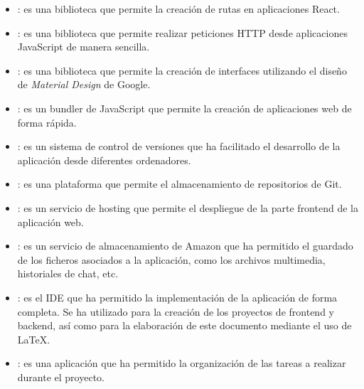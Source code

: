 \begin{itemize}
	\item {}: es una biblioteca que permite la creación de rutas en aplicaciones React.
	\item {}: es una biblioteca que permite realizar peticiones HTTP desde aplicaciones JavaScript de
	manera sencilla.
	\item {}: es una biblioteca que permite la creación de interfaces utilizando el diseño de
	\textit{Material Design} de Google.
	\item {}: es un bundler de JavaScript que permite la creación de aplicaciones web de forma rápida.
	\item {}: es un sistema de control de versiones que ha facilitado el desarrollo de la aplicación desde
	diferentes ordenadores.
	\item {}: es una plataforma que permite el almacenamiento de repositorios de Git.
	\item {}: es un servicio de hosting que permite el despliegue de la parte frontend de la
	aplicación web.
	\item {}: es un servicio de almacenamiento de Amazon que ha permitido el guardado de los ficheros
	asociados a la aplicación, como los archivos multimedia, historiales de chat, etc.
	\item {}: es el IDE que ha permitido la implementación de la aplicación de forma completa.
	Se ha utilizado para la creación de los proyectos de frontend y backend, así como para la
	elaboración de este documento mediante el uso de \LaTeX.
	\item {}: es una aplicación que ha permitido la organización de las tareas a realizar durante el
	proyecto.
\end{itemize}
